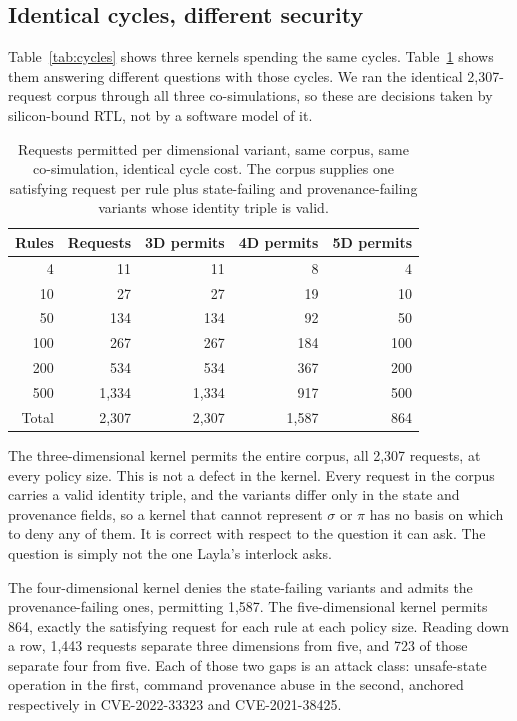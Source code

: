 \documentclass[conference]{IEEEtran}
\newcommand{\new}[1]{\textcolor{hkred}{#1}}
\newcommand{\newcolor}{\color{hkred}}
\begin{document}
\subsection{\new{Identical cycles, different security}}

\new{Table~\ref{tab:cycles} shows three kernels spending the same cycles. Table~\ref{tab:rtlauth} shows them answering different questions with those cycles. We ran the identical 2{,}307-request corpus through all three co-simulations, so these are decisions taken by silicon-bound RTL, not by a software model of it.}

\begin{table}[t]
\caption{\new{Requests permitted per dimensional variant, same corpus, same co-simulation, identical cycle cost. The corpus supplies one satisfying request per rule plus state-failing and provenance-failing variants whose identity triple is valid.}}
\label{tab:rtlauth}
\centering
\newcolor
\begin{tabular}{rrrrr}
\toprule
Rules & Requests & 3D permits & 4D permits & 5D permits \\
\midrule
4 & 11 & 11 & 8 & 4 \\
10 & 27 & 27 & 19 & 10 \\
50 & 134 & 134 & 92 & 50 \\
100 & 267 & 267 & 184 & 100 \\
200 & 534 & 534 & 367 & 200 \\
500 & 1{,}334 & 1{,}334 & 917 & 500 \\
\midrule
Total & 2{,}307 & 2{,}307 & 1{,}587 & 864 \\
\bottomrule
\end{tabular}
\end{table}

\new{The three-dimensional kernel permits the entire corpus, all 2{,}307 requests, at every policy size. This is not a defect in the kernel. Every request in the corpus carries a valid identity triple, and the variants differ only in the state and provenance fields, so a kernel that cannot represent $\sigma$ or $\pi$ has no basis on which to deny any of them. It is correct with respect to the question it can ask. The question is simply not the one Layla's interlock asks.}

\new{The four-dimensional kernel denies the state-failing variants and admits the provenance-failing ones, permitting 1{,}587. The five-dimensional kernel permits 864, exactly the satisfying request for each rule at each policy size. Reading down a row, 1{,}443 requests separate three dimensions from five, and 723 of those separate four from five. Each of those two gaps is an attack class: unsafe-state operation in the first, command provenance abuse in the second, anchored respectively in CVE-2022-33323 and CVE-2021-38425.}
\end{document}
